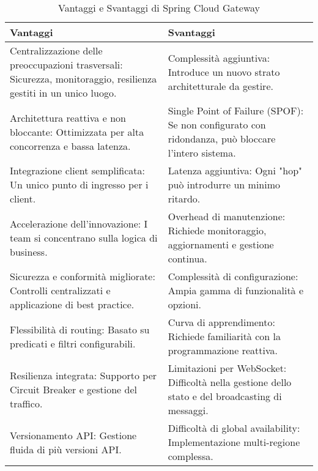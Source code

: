 \begin{table}[ht!]
\centering
\caption{Vantaggi e Svantaggi di Spring Cloud Gateway}
\renewcommand{\arraystretch}{1.5}
\label{tab:vantaggi_svantaggi}
\begin{tabularx}{\linewidth}{%
    >{\RaggedRight\arraybackslash}X %
    >{\RaggedRight\arraybackslash}X %
}
\toprule
\textbf{Vantaggi} & \textbf{Svantaggi} \\
\midrule
Centralizzazione delle preoccupazioni trasversali: Sicurezza, monitoraggio, resilienza gestiti in un unico luogo. & Complessità aggiuntiva: Introduce un nuovo strato architetturale da gestire. \\
Architettura reattiva e non bloccante: Ottimizzata per alta concorrenza e bassa latenza. & Single Point of Failure (SPOF): Se non configurato con ridondanza, può bloccare l'intero sistema. \\
Integrazione client semplificata: Un unico punto di ingresso per i client. & Latenza aggiuntiva: Ogni "hop" può introdurre un minimo ritardo. \\
Accelerazione dell'innovazione: I team si concentrano sulla logica di business. & Overhead di manutenzione: Richiede monitoraggio, aggiornamenti e gestione continua. \\
Sicurezza e conformità migliorate: Controlli centralizzati e applicazione di best practice. & Complessità di configurazione: Ampia gamma di funzionalità e opzioni. \\
Flessibilità di routing: Basato su predicati e filtri configurabili. & Curva di apprendimento: Richiede familiarità con la programmazione reattiva. \\
Resilienza integrata: Supporto per Circuit Breaker e gestione del traffico. & Limitazioni per WebSocket: Difficoltà nella gestione dello stato e del broadcasting di messaggi. \\
Versionamento API: Gestione fluida di più versioni API. & Difficoltà di global availability: Implementazione multi-regione complessa. \\
\bottomrule
\end{tabularx}
\end{table}
